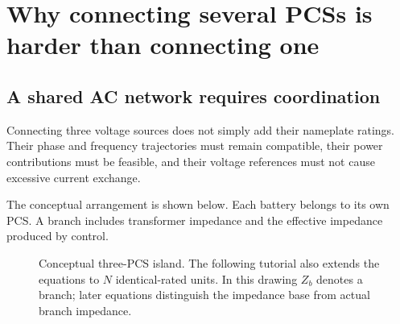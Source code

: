 \documentclass[11pt,a4paper]{article}
\begin{document}
\section{Why connecting several PCSs is harder than connecting one}
\subsection{A shared AC network requires coordination}
Connecting three voltage sources does not simply add their nameplate ratings. Their phase and frequency trajectories must remain compatible, their power contributions must be feasible, and their voltage references must not cause excessive current exchange.

The conceptual arrangement is shown below. Each battery belongs to its own PCS. A branch includes transformer impedance and the effective impedance produced by control.
\begin{figure}[htbp]
\centering
{}
\caption{Conceptual three-PCS island. The following tutorial also extends the equations to $N$ identical-rated units. In this drawing $Z_b$ denotes a branch; later equations distinguish the impedance base from actual branch impedance.}
\end{figure}
\end{document}
